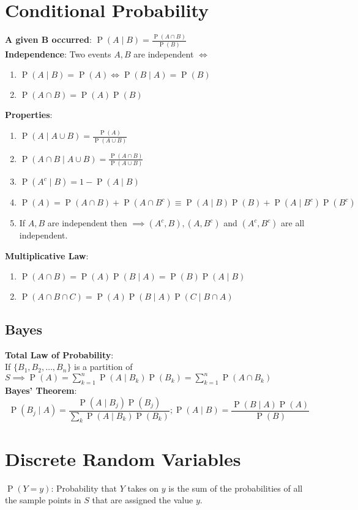 \documentclass[12pt]{article}
\newcommand{\set}[1]{\{#1\}}
\newcommand{\defn}[1]{\textbf{#1}:}
\newcommand{\pr}[1]{\operatorname{P}(#1)}
\begin{document}
\section{Conditional Probability}
\defn{A given B occurred} $\pr{A \mid B} = \frac{\pr{A \cap B}}{\pr{B}}$\\
\defn{Independence} Two events $A,B$ are independent $\iff$
\begin{enumerate}[label=(\roman*)]
    \item $\pr{A\mid B} = \pr{A} \iff \pr{B\mid A} = \pr{B}$
    \item $\pr{A\cap B} = \pr{A}\pr{B}$
\end{enumerate}
\defn{Properties}
\begin{enumerate}[label=(\roman*)]
    \item $\pr{A \mid A\cup B} = \frac{\pr{A}}{\pr{A \cup B}}$
    \item $\pr{A\cap B \mid A\cup B} = \frac{\pr{A \cap B}}{\pr{A \cup B}}$
    \item $\pr{A^c \mid B} = 1 - \pr{A \mid B}$
    \item $\pr{A} = \pr{A \cap B} + \pr{A \cap B^c} \equiv \pr{A\mid B}\pr{B} + \pr{A\mid B^c}\pr{B^c}$
    \item If $A,B$ are independent then $\implies (A^c, B), (A, B^c)$ and $(A^c, B^c)$ are all independent.
\end{enumerate}
\defn{Multiplicative Law} \begin{enumerate}[label=(\roman*)]
    \item $\pr{A\cap B} = \pr{A}\pr{B \mid A} = \pr{B}\pr{A \mid B}$
    \item $\pr{A \cap B \cap C} = \pr{A}\pr{B\mid A}\pr{C \mid B\cap A}$
\end{enumerate}

\subsection{Bayes}
\defn{Total Law of Probability}\\
If $\set{B_1, B_2, \ldots, B_n}$ is a partition of 
$S \implies \pr{A} = \sum_{k=1}^{n}\pr{A \mid B_k}\pr{B_k} = \sum_{k=1}^{n}\pr{A \cap B_k}$\\
\defn{Bayes' Theorem}
\[
    \pr{B_j \mid A} = 
    \frac{\pr{A \mid B_j}\pr{B_j}}{\sum\limits_{k}\pr{A \mid B_k}\pr{B_k}};
    \pr{A\mid B} = \frac{\pr{B \mid A}\pr{A}}{\pr{B}}
\]


\section{Discrete Random Variables}
\defn{$\pr{Y=y}$} Probability that $Y$ takes on $y$ is the sum of the probabilities of all
the sample points in $S$ that are assigned the value $y$.
\end{document}
